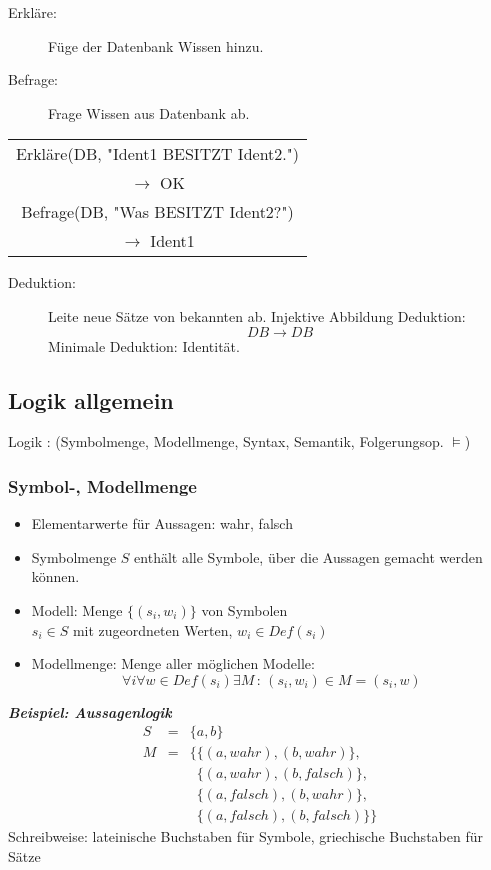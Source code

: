 \begin{description}
\item[Erkläre:] Füge der Datenbank Wissen hinzu.
\item[Befrage:] Frage Wissen aus Datenbank ab.
\end{description}
\begin{center}
\begin{tabular}{|c|}
\hline
Erkläre(DB, "{}Ident1 BESITZT Ident2."{}) \\ $\to$ OK \\ Befrage(DB, "{}Was BESITZT Ident2?"{}) \\ $\to$ Ident1 \\ \hline
\end{tabular}
\end{center}


\begin{description}
\item[Deduktion:] Leite neue Sätze von bekannten ab. Injektive Abbildung Deduktion: $$DB \to DB$$ Minimale Deduktion: Identität.
\end{description}

\subsection{Logik allgemein}

\begin{center}
Logik \quad : \quad (Symbolmenge, Modellmenge, Syntax, Semantik, Folgerungsop. $\models$)
\end{center}

\subsubsection*{Symbol-, Modellmenge}

\begin{itemize}
\item Elementarwerte für Aussagen: wahr, falsch
\item Symbolmenge $S$ enthält alle Symbole, über die Aussagen gemacht werden können.
\item Modell: Menge $\{(s_i,w_i)\}$ von Symbolen \\ $s_i \in S$ mit zugeordneten Werten, $w_i \in Def(s_i)$
\item Modellmenge: Menge aller möglichen Modelle: $$\forall i \forall w \in Def(s_i) \exists M \, : \, (s_i,w_i) \in M = (s_i,w)$$
\end{itemize}
\textbf{\textsl{Beispiel: Aussagenlogik}}
\begin{eqnarray*}
S &=& \{a,b\} \\ M &=& \{ \{ (a,wahr),(b,wahr) \} , \\ && \,\,\, \{ (a,wahr),(b,falsch)\} , \\ && \,\,\, \{ (a,falsch),(b,wahr) \} , \\ && \,\,\, \{ (a,falsch) , (b,falsch) \} \}
\end{eqnarray*}
Schreibweise: lateinische Buchstaben für Symbole, griechische Buchstaben für Sätze

